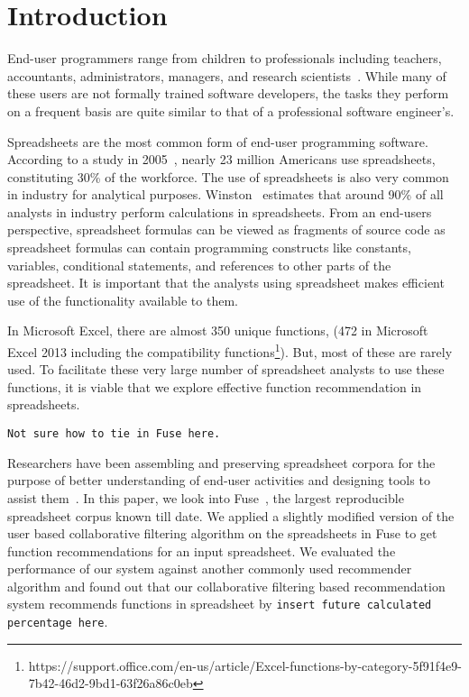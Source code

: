 \documentclass[conference]{IEEEtran}
\begin{document}
%
\IEEEpeerreviewmaketitle

\section{Introduction}

End-user programmers range from children to professionals including teachers, accountants, administrators, managers, and research scientists~\cite{ko2011state}. While many of these users are not formally trained software developers, the tasks they perform on a frequent basis are quite similar to that of a professional software engineer's.

Spreadsheets are the most common form of  end-user programming software. According to a study in 2005~\cite{scaffidi2005estimating}, nearly 23 million Americans use spreadsheets, constituting 30\% of the workforce. The use of spreadsheets is also very common in industry for analytical purposes. Winston~\cite{winston2001executive} estimates that around 90\% of all analysts in industry perform calculations in spreadsheets. From an end-users perspective, spreadsheet formulas can be viewed as fragments of source code as spreadsheet formulas can contain programming constructs like constants, variables, conditional statements, and references to other parts of the spreadsheet. It is important that the analysts using spreadsheet makes efficient use of the functionality available to them.

In Microsoft Excel, there are almost 350 unique functions, (472 in Microsoft Excel 2013 including the compatibility functions\footnote{https://support.office.com/en-us/article/Excel-functions-by-category-5f91f4e9-7b42-46d2-9bd1-63f26a86c0eb}). But, most of these are rarely used. To facilitate these very large number of spreadsheet analysts to use these functions, it is viable that we explore effective function recommendation in spreadsheets.

\texttt{Not sure how to tie in Fuse here.}

Researchers have been assembling and preserving spreadsheet corpora for the purpose of better understanding of end-user activities and designing tools to assist them~\cite{fisher2005euses, hermans2014enron}. In this paper, we look into Fuse~\cite{barik2015fuse}, the largest reproducible spreadsheet corpus known till date. We applied a slightly modified version of the user based collaborative filtering algorithm on the spreadsheets in Fuse to get function recommendations for an input spreadsheet. We evaluated the performance of our system against another commonly used recommender algorithm and found out that our collaborative filtering based recommendation system recommends functions in spreadsheet by \texttt{insert future calculated percentage here}. 
\end{document}
